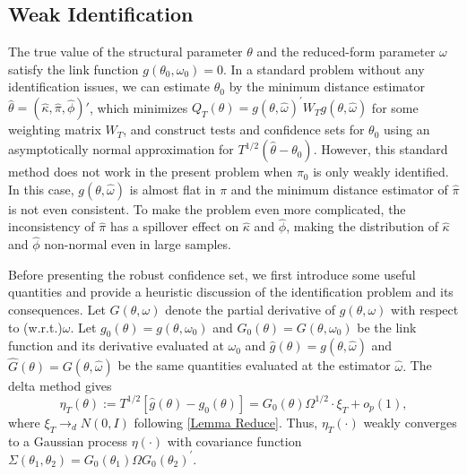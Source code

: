 \documentclass[11pt, letterpaper, twoside]{article}
\begin{document}
\subsection{Weak Identification}

The true value of the structural parameter $\theta$ and the reduced-form parameter $\omega$ satisfy the link function $g(\theta_{0},\omega _{0})=0$. In a standard problem without any identification issues, we can estimate $\theta _{0}$ by the minimum distance estimator $\widehat{\theta} =(\widehat{\kappa },\widehat{\pi },\widehat{\phi})'$, which minimizes $ Q_{T}(\theta )=g(\theta ,\widehat{\omega })^{\prime }W_{T}g(\theta , \widehat{\omega })$ for some weighting matrix $W_{T}$, and construct tests and confidence sets for $\theta _{0}$ using an asymptotically normal approximation for $T^{1/2}(\widehat{\theta }-\theta _{0})$. However, this standard method does not work in the present problem when $\pi _{0}$ is only weakly identified. In this case, $g(\theta ,\widehat{\omega })$ is almost flat in $\pi $ and the minimum distance estimator of $\widehat{\pi }$ is not even consistent. To make the problem even more complicated, the inconsistency of $\widehat{\pi }$ has a spillover effect on $\widehat{\kappa }$ and $\widehat{\phi}$, making the distribution of $\widehat{\kappa }$ and $\widehat{\phi }$ non-normal even in large samples.

Before presenting the robust confidence set, we first introduce some useful quantities and provide a heuristic discussion of the identification problem and its consequences. Let $G(\theta ,\omega )$ denote the partial derivative of $ g(\theta ,\omega )$ with respect to (w.r.t.)\@ $\omega .$ Let $g_{0}(\theta )=g(\theta ,\omega _{0})$ and $G_{0}(\theta )=G(\theta ,\omega _{0})$ be the link function and its derivative evaluated at $\omega _{0}$ and $\widehat{g}(\theta
)=g(\theta ,\widehat{\omega })$ and $\widehat{G}(\theta )=G(\theta , \widehat{\omega })$ be the same quantities evaluated at the estimator $ \widehat{\omega }.$ The delta method gives 
%
\begin{equation}
    \eta _{T}(\theta ):=T^{1/2}\left[ \widehat{g}(\theta )-g_{0}(\theta ) \right] =G_{0}(\theta )\Omega ^{1/2}\cdot \xi _{T}+o_{p}(1),
    \label{emp pro}
\end{equation}
%
where $\xi _{T}\rightarrow _{d}N(0,I)$ following \cref{Lemma Reduce}.  Thus, $\eta _{T}(\cdot )$ weakly converges to a Gaussian process $\eta (\cdot )$ with covariance function $\Sigma (\theta _{1},\theta _{2})=G_{0}(\theta _{1})\Omega G_{0}(\theta _{2})^{\prime }.$
\end{document}
